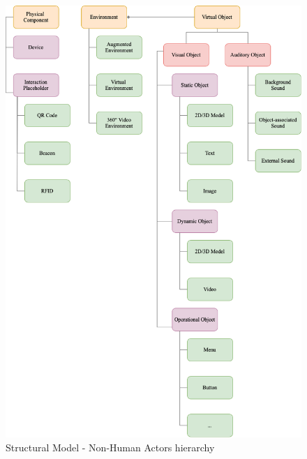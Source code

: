 \begin{figure}[H]
	\centering
	\includegraphics[width=14cm]{Figures/Conceptual Model/NonHumanActors.png}
	\caption{Structural Model - Non-Human Actors hierarchy}
	\label{fig:NonHumanActors}
\end{figure}

